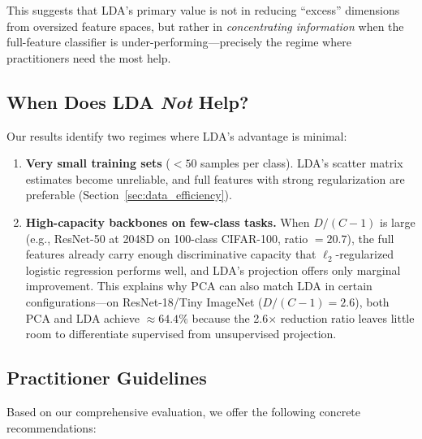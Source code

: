 This suggests that LDA's primary value is not in reducing ``excess'' dimensions from oversized feature spaces, but rather in \emph{concentrating information} when the full-feature classifier is under-performing---precisely the regime where practitioners need the most help.

\subsection{When Does LDA \textit{Not} Help?}

Our results identify two regimes where LDA's advantage is minimal:

\begin{enumerate}[leftmargin=*]
    \item \textbf{Very small training sets} ($< 50$ samples per class). LDA's scatter matrix estimates become unreliable, and full features with strong regularization are preferable (Section~\ref{sec:data_efficiency}).

    \item \textbf{High-capacity backbones on few-class tasks.} When $D/(C-1)$ is large (e.g., ResNet-50 at 2048D on 100-class CIFAR-100, ratio $= 20.7$), the full features already carry enough discriminative capacity that $\ell_2$-regularized logistic regression performs well, and LDA's projection offers only marginal improvement. This explains why PCA can also match LDA in certain configurations---on ResNet-18/Tiny ImageNet ($D/(C-1) = 2.6$), both PCA and LDA achieve $\approx 64.4\%$ because the 2.6$\times$ reduction ratio leaves little room to differentiate supervised from unsupervised projection.
\end{enumerate}

\subsection{Practitioner Guidelines}
\label{sec:guidelines}

Based on our comprehensive evaluation, we offer the following concrete recommendations:

